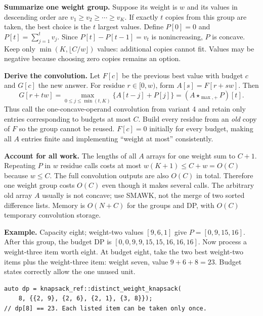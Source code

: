 \textbf{Summarize one weight group.} Suppose its weight is $w$ and
its values in descending order are $v_1\ge v_2\ge\cdots\ge v_K$.
If exactly $t$ copies from this group are taken, the best choice is
the $t$ largest values. Define
$P[0]=0$ and $P[t]=\sum_{j=1}^{t}v_j$.
Since $P[t]-P[t-1]=v_t$ is nonincreasing, $P$ is concave.
Keep only $\min(K,\lfloor C/w\rfloor)$ values: additional copies
cannot fit. Values may be negative because choosing zero copies
remains an option.

\textbf{Derive the convolution.} Let $F[c]$ be the previous best
value with budget $c$ and $G[c]$ the new answer. For residue
$r\in[0,w)$, form $A[s]=F[r+sw]$. Then
\[
 G[r+tw]=\max_{0\le j\le\min(t,K)}
                \{A[t-j]+P[j]\}=(A\star_{\max,+}P)[t].
\]
Thus call the one-concave-operand convolution from variant 4 and
retain only entries corresponding to budgets at most $C$.
Build every residue from an \emph{old} copy of $F$ so the group
cannot be reused. $F[c]=0$ initially for every budget, making all
$A$ entries finite and implementing ``weight at most'' consistently.

\textbf{Account for all work.} The lengths of all $A$ arrays for one
weight sum to $C+1$. Repeating $P$ in $w$ residue calls costs at most
$w(K+1)\le C+w=O(C)$ because $w\le C$.
The full convolution outputs are also $O(C)$ in total. Therefore
one weight group costs $O(C)$ even though it makes several calls.
The arbitrary old array $A$ usually is not concave; use SMAWK, not
the merge of two sorted difference lists. Memory is $O(N+C)$ for
the groups and DP, with $O(C)$ temporary convolution storage.

\textbf{Example.} Capacity eight; weight-two values $[9,6,1]$ give
$P=[0,9,15,16]$. After this group, the budget DP is
$[0,0,9,9,15,15,16,16,16]$.
Now process a weight-three item worth eight. At budget eight,
take the two best weight-two items plus the weight-three item:
weight seven, value $9+6+8=23$. Budget states correctly allow the
one unused unit.

\begin{minipage}{\linewidth}
\begin{lstlisting}[style=C++,showstringspaces=false]
auto dp = knapsack_ref::distinct_weight_knapsack(
    8, {{2, 9}, {2, 6}, {2, 1}, {3, 8}});
// dp[8] == 23. Each listed item can be taken only once.
\end{lstlisting}
\end{minipage}
\par

